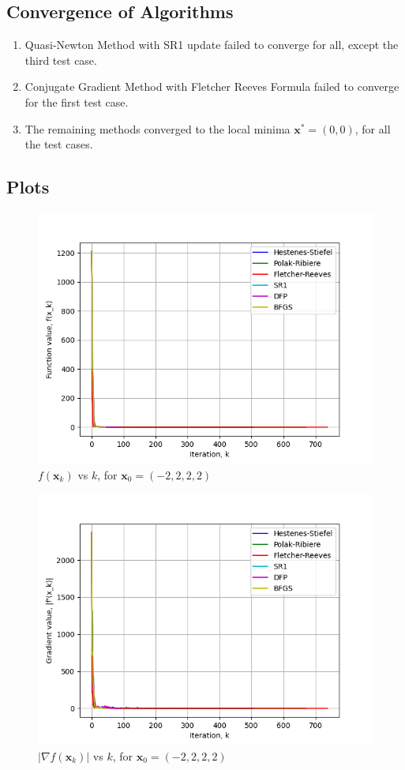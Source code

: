 \documentclass[a4paper]{article}
\begin{document}
\subsection{Convergence of Algorithms}

\begin{enumerate}

\item Quasi-Newton Method with SR1 update failed to converge for all, except the third test case.

\item Conjugate Gradient Method with Fletcher Reeves Formula failed to converge for the first test case.

\item The remaining methods converged to the local minima $\textbf{x}^* = (0, 0)$, for all the test cases.

\end{enumerate}

\subsection{Plots}

\begin{figure}[H]
    \centering
    \includegraphics[width=.65\textwidth]{images/rosenbrock_function_vals.png}
    \caption{$f(\textbf{x}_k)$ vs $k$, for $\textbf{x}_0 = (-2, 2, 2, 2)$}
\end{figure}

\begin{figure}[H]
    \centering
    \includegraphics[width=.65\textwidth]{images/rosenbrock_function_grad.png}
    \caption{$|\nabla f(\textbf{x}_k)|$ vs $k$, for $\textbf{x}_0 = (-2, 2, 2, 2)$}
\end{figure}
\end{document}
